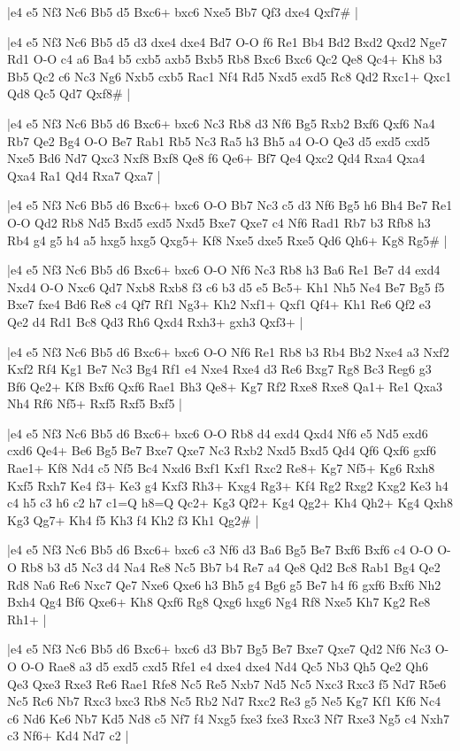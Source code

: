 \whitename{}
\blackname{}
\makegametitle
|e4 e5 Nf3 Nc6 Bb5 d5 Bxc6+ bxc6 Nxe5 Bb7 Qf3 dxe4 Qxf7\#  |

\whitename{}
\blackname{}
\makegametitle
|e4 e5 Nf3 Nc6 Bb5 d5 d3 dxe4 dxe4 Bd7 O-O f6 Re1 Bb4 Bd2 Bxd2 Qxd2 Nge7 Rd1 O-O c4 a6 Ba4 b5 cxb5 axb5 Bxb5 Rb8 Bxc6 Bxc6 Qc2 Qe8 Qc4+ Kh8 b3 Bb5 Qc2 c6 Nc3 Ng6 Nxb5 cxb5 Rac1 Nf4 Rd5 Nxd5 exd5 Rc8 Qd2 Rxc1+ Qxc1 Qd8 Qc5 Qd7 Qxf8\#  |

\whitename{}
\blackname{}
\makegametitle
|e4 e5 Nf3 Nc6 Bb5 d6 Bxc6+ bxc6 Nc3 Rb8 d3 Nf6 Bg5 Rxb2 Bxf6 Qxf6 Na4 Rb7 Qe2 Bg4 O-O Be7 Rab1 Rb5 Nc3 Ra5 h3 Bh5 a4 O-O Qe3 d5 exd5 cxd5 Nxe5 Bd6 Nd7 Qxc3 Nxf8 Bxf8 Qe8 f6 Qe6+ Bf7 Qe4 Qxc2 Qd4 Rxa4 Qxa4 Qxa4 Ra1 Qd4 Rxa7 Qxa7  |

\whitename{}
\blackname{}
\makegametitle
|e4 e5 Nf3 Nc6 Bb5 d6 Bxc6+ bxc6 O-O Bb7 Nc3 c5 d3 Nf6 Bg5 h6 Bh4 Be7 Re1 O-O Qd2 Rb8 Nd5 Bxd5 exd5 Nxd5 Bxe7 Qxe7 c4 Nf6 Rad1 Rb7 b3 Rfb8 h3 Rb4 g4 g5 h4 a5 hxg5 hxg5 Qxg5+ Kf8 Nxe5 dxe5 Rxe5 Qd6 Qh6+ Kg8 Rg5\#  |

\whitename{}
\blackname{}
\makegametitle
|e4 e5 Nf3 Nc6 Bb5 d6 Bxc6+ bxc6 O-O Nf6 Nc3 Rb8 h3 Ba6 Re1 Be7 d4 exd4 Nxd4 O-O Nxc6 Qd7 Nxb8 Rxb8 f3 c6 b3 d5 e5 Bc5+ Kh1 Nh5 Ne4 Be7 Bg5 f5 Bxe7 fxe4 Bd6 Re8 c4 Qf7 Rf1 Ng3+ Kh2 Nxf1+ Qxf1 Qf4+ Kh1 Re6 Qf2 e3 Qe2 d4 Rd1 Bc8 Qd3 Rh6 Qxd4 Rxh3+ gxh3 Qxf3+  |

\whitename{}
\blackname{}
\makegametitle
|e4 e5 Nf3 Nc6 Bb5 d6 Bxc6+ bxc6 O-O Nf6 Re1 Rb8 b3 Rb4 Bb2 Nxe4 a3 Nxf2 Kxf2 Rf4 Kg1 Be7 Nc3 Bg4 Rf1 e4 Nxe4 Rxe4 d3 Re6 Bxg7 Rg8 Bc3 Reg6 g3 Bf6 Qe2+ Kf8 Bxf6 Qxf6 Rae1 Bh3 Qe8+ Kg7 Rf2 Rxe8 Rxe8 Qa1+ Re1 Qxa3 Nh4 Rf6 Nf5+ Rxf5 Rxf5 Bxf5  |

\whitename{}
\blackname{}
\makegametitle
|e4 e5 Nf3 Nc6 Bb5 d6 Bxc6+ bxc6 O-O Rb8 d4 exd4 Qxd4 Nf6 e5 Nd5 exd6 cxd6 Qe4+ Be6 Bg5 Be7 Bxe7 Qxe7 Nc3 Rxb2 Nxd5 Bxd5 Qd4 Qf6 Qxf6 gxf6 Rae1+ Kf8 Nd4 c5 Nf5 Bc4 Nxd6 Bxf1 Kxf1 Rxc2 Re8+ Kg7 Nf5+ Kg6 Rxh8 Kxf5 Rxh7 Ke4 f3+ Ke3 g4 Kxf3 Rh3+ Kxg4 Rg3+ Kf4 Rg2 Rxg2 Kxg2 Ke3 h4 c4 h5 c3 h6 c2 h7 c1=Q h8=Q Qc2+ Kg3 Qf2+ Kg4 Qg2+ Kh4 Qh2+ Kg4 Qxh8 Kg3 Qg7+ Kh4 f5 Kh3 f4 Kh2 f3 Kh1 Qg2\#  |

\whitename{}
\blackname{}
\makegametitle
|e4 e5 Nf3 Nc6 Bb5 d6 Bxc6+ bxc6 c3 Nf6 d3 Ba6 Bg5 Be7 Bxf6 Bxf6 c4 O-O O-O Rb8 b3 d5 Nc3 d4 Na4 Re8 Nc5 Bb7 b4 Re7 a4 Qe8 Qd2 Bc8 Rab1 Bg4 Qe2 Rd8 Na6 Re6 Nxc7 Qe7 Nxe6 Qxe6 h3 Bh5 g4 Bg6 g5 Be7 h4 f6 gxf6 Bxf6 Nh2 Bxh4 Qg4 Bf6 Qxe6+ Kh8 Qxf6 Rg8 Qxg6 hxg6 Ng4 Rf8 Nxe5 Kh7 Kg2 Re8 Rh1+  |

\whitename{}
\blackname{}
\makegametitle
|e4 e5 Nf3 Nc6 Bb5 d6 Bxc6+ bxc6 d3 Bb7 Bg5 Be7 Bxe7 Qxe7 Qd2 Nf6 Nc3 O-O O-O Rae8 a3 d5 exd5 cxd5 Rfe1 e4 dxe4 dxe4 Nd4 Qc5 Nb3 Qh5 Qe2 Qh6 Qe3 Qxe3 Rxe3 Re6 Rae1 Rfe8 Nc5 Re5 Nxb7 Nd5 Nc5 Nxc3 Rxc3 f5 Nd7 R5e6 Nc5 Rc6 Nb7 Rxc3 bxc3 Rb8 Nc5 Rb2 Nd7 Rxc2 Re3 g5 Ne5 Kg7 Kf1 Kf6 Nc4 c6 Nd6 Ke6 Nb7 Kd5 Nd8 c5 Nf7 f4 Nxg5 fxe3 fxe3 Rxc3 Nf7 Rxe3 Ng5 c4 Nxh7 c3 Nf6+ Kd4 Nd7 c2  |

